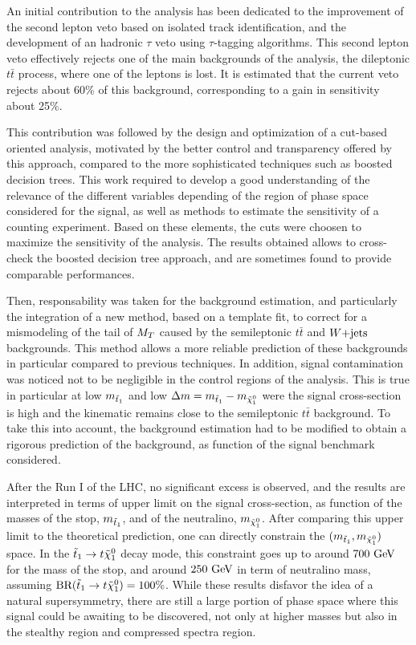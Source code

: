 An initial contribution to the analysis has been dedicated to the improvement of the
second lepton veto based on isolated track identification, and the development of an
hadronic $\tau$ veto using $\tau$-tagging algorithms. This second lepton veto effectively
rejects one  of the main backgrounds of the analysis, the dileptonic $t\bar{t}$ process,
where one of the leptons is lost. It is estimated that the current veto rejects about
60\% of this background, corresponding to a gain in sensitivity about 25\%.

This contribution was followed by the design and optimization of a cut-based oriented
analysis, motivated by the better control and transparency offered by this approach,
compared to the more sophisticated techniques such as boosted decision trees.
This work required to develop a good understanding of the relevance of the different
variables depending of the region of phase space considered for the signal, as well as methods
to estimate the sensitivity of a counting experiment. Based on these elements, the
cuts were choosen to maximize the sensitivity of the analysis. The results obtained
allows to cross-check the boosted decision tree approach, and are sometimes found to
provide comparable performances.

Then, responsability was taken for the background estimation, and particularly the integration
of a new method, based on a template fit, to correct for a mismodeling of the tail of $M_T$ caused
by the semileptonic $t\bar{t}$ and $\text{$W$+jets}$ backgrounds. This method allows a more reliable prediction
of these backgrounds in particular compared to previous techniques. In addition, signal
contamination was noticed not to be negligible in the control regions of the analysis. This
is true in particular at low $m_{\tilde{t}_1}$ and low $\Delta m = m_{\tilde{t}_1} - m_{\tilde{\chi}_1^0}$
were the signal cross-section is high and the kinematic remains close to the semileptonic
$t\bar{t}$ background. To take this into account, the background estimation had to be
modified to obtain a rigorous prediction of the background, as function of the signal
benchmark considered.

After the Run I of the LHC, no significant excess is observed, and the results are
interpreted in terms of upper limit on the signal cross-section, as function of the masses
of the stop, $m_{\tilde{t}_1}$, and of the neutralino, $m_{\tilde{\chi}_1^0}$. After comparing
this upper limit to the theoretical prediction, one can directly constrain the
$(m_{\tilde{t}_1},m_{\tilde{\chi}_1^0})$ space. In the $\tilde{t}_1 \rightarrow t \tilde{\chi}_1^0$
decay mode, this constraint goes up to around $700~\text{GeV}$ for the mass of the stop,
and around $250~\text{GeV}$ in term of neutralino mass, assuming $\text{BR}(\tilde{t}_1 \rightarrow t \tilde{\chi}_1^0) = 100\%$.
While these results disfavor the idea of a natural supersymmetry, there are still a large portion
of phase space where this signal could be awaiting to be discovered, not only at higher
masses but also in the stealthy region and compressed spectra region.

